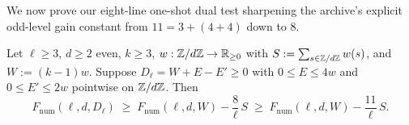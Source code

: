 We now prove our eight-line one-shot dual test sharpening the archive's explicit odd-level gain constant from $11 = 3 + (4 + 4)$ down to $8$.


\begin{proposition}
\label{prop:08:const-eight}
Let $\ell \ge 3$, $d \ge 2$ even, $k \ge 3$, $w : \mathbb{Z}/d\mathbb{Z} \to \mathbb{R}_{\ge 0}$ with $S := \sum_{s \in \mathbb{Z}/d\mathbb{Z}} w(s)$, and $W := (k - 1)w$. Suppose $D_\ell = W + E - E' \ge 0$ with $0 \le E \le 4 w$ and $0 \le E' \le 2 w$ pointwise on $\mathbb{Z}/d\mathbb{Z}$. Then
\begin{equation}
\label{eq:08:const-eight}
  F_{\mathrm{num}}(\ell, d, D_\ell) \;\ge\; F_{\mathrm{num}}(\ell, d, W) - \frac{8}{\ell}\, S
  \;\ge\; F_{\mathrm{num}}(\ell, d, W) - \frac{11}{\ell}\, S.
\end{equation}
\end{proposition}

